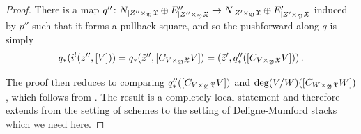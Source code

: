 \documentclass[a4paper,12pt]{article} %
\theoremstyle{definition}
\theoremstyle{plain}%
\newcommand{\jocomment}[1]{}
\begin{document}
\begin{proof}
There is a map $q''\colon N_{\mid Z'' \times_{\frak Y} \frak X} \oplus E''_{\mid Z'' \times_{\frak Y} \frak X} \to  N_{\mid Z' \times_{\frak Y} \frak X} \oplus E'_{\mid Z' \times_{\frak Y} \frak X}$ induced by $p''$ such that it forms a pullback square, and so 
 the pushforward along $q$ is simply 
$$q_*(i^!(z'', [V])) = q_*(\tilde{z}'', [C_{V\times_{\frak Y} \frak X} V]) = (\tilde{z}', q''_*([C_{V\times_{\frak Y} \frak X} V]))\, . $$ 

The proof then reduces to comparing $q''_*([C_{V\times_{\frak Y} \frak X} V])$ and $\deg(V/W)([C_{W\times_{\frak Y} \frak X} W])$, which follows from \cite[Lemma 3.15]{Vistoli1989Intersection-th}. The result is a completely local statement and
therefore extends from the setting of schemes to the setting of Deligne-Mumford stacks which we need here. %
\end{proof}
\end{document}

